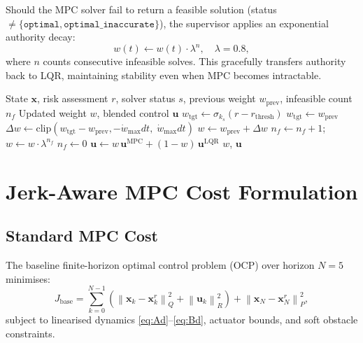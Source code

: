 \documentclass[journal]{IEEEtran}
\newcommand{\norm}[1]{\left\lVert#1\right\rVert}
\begin{document}
Should the MPC solver fail to return a feasible solution (status
\(\neq\{\texttt{optimal},\texttt{optimal\_inaccurate}\}\)), the supervisor
applies an exponential authority decay:
\begin{equation}\label{eq:decay}
  w(t) \leftarrow w(t)\cdot\lambda^n, \quad \lambda = 0.8,
\end{equation}
where \(n\) counts consecutive infeasible solves.
This gracefully transfers authority back to LQR, maintaining stability even
when MPC becomes intractable.

\begin{algorithm}
\caption{BlendingSupervisor online update}
\begin{algorithmic}[1]
\Require State $\mathbf{x}$, risk assessment $r$, solver status $s$,
         previous weight $w_{\mathrm{prev}}$, infeasible count $n_f$
\Ensure  Updated weight $w$, blended control $\mathbf{u}$
\State $w_{\mathrm{tgt}} \gets \sigma_{k_s}(r - r_{\mathrm{thresh}})$
  \State $w_{\mathrm{tgt}} \gets w_{\mathrm{prev}}$
\EndIf
\State $\Delta w \gets \mathrm{clip}(w_{\mathrm{tgt}}-w_{\mathrm{prev}}, -\dot{w}_{\max}dt,\; \dot{w}_{\max}dt)$
\State $w \gets w_{\mathrm{prev}} + \Delta w$
  \State $n_f \gets n_f + 1$;\quad $w \gets w \cdot \lambda^{n_f}$
\Else
  \State $n_f \gets 0$
\EndIf
\State $\mathbf{u} \gets w\,\mathbf{u}^{\mathrm{MPC}} + (1-w)\,\mathbf{u}^{\mathrm{LQR}}$
\Return $w$, $\mathbf{u}$
\end{algorithmic}
\end{algorithm}

\section{Jerk-Aware MPC Cost Formulation}\label{sec:jerk}

\subsection{Standard MPC Cost}

The baseline finite-horizon optimal control problem (OCP) over horizon
\(N = 5\) minimises:
\begin{equation}
  J_{\mathrm{base}} =
    \sum_{k=0}^{N-1}\!\!\left(
      \norm{\mathbf{x}_k - \mathbf{x}^r_k}_{Q}^2 +
      \norm{\mathbf{u}_k}_{R}^2
    \right) + \norm{\mathbf{x}_N-\mathbf{x}^r_N}_{P}^2,
\end{equation}
subject to linearised dynamics \eqref{eq:Ad}--\eqref{eq:Bd}, actuator bounds,
and soft obstacle constraints.
\end{document}
